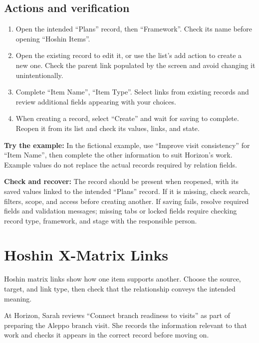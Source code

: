 \subsection{Actions and verification}
\begin{enumerate}
\item Open the intended “Plans” record, then “Framework”. Check its name before opening “Hoshin Items”.
\item Open the existing record to edit it, or use the list's add action to create a new one. Check the parent link populated by the screen and avoid changing it unintentionally.
\item Complete “Item Name”, “Item Type”. Select links from existing records and review additional fields appearing with your choices.
\item When creating a record, select “Create” and wait for saving to complete. Reopen it from its list and check its values, links, and state.
\end{enumerate}

\textbf{Try the example:} In the fictional example, use “Improve visit consistency” for “Item Name”, then complete the other information to suit Horizon's work. Example values do not replace the actual records required by relation fields.

\textbf{Check and recover:} The record should be present when reopened, with its saved values linked to the intended “Plans” record. If it is missing, check search, filters, scope, and access before creating another. If saving fails, resolve required fields and validation messages; missing tabs or locked fields require checking record type, framework, and stage with the responsible person.

\clearpage
\section{Hoshin X-Matrix Links}
\label{sec:projects-feature-planning-hoshin-x-matrix-links}

Hoshin matrix links show how one item supports another. Choose the source, target, and link type, then check that the relationship conveys the intended meaning.

\begin{rcnote}
At Horizon, Sarah reviews “Connect branch readiness to visits” as part of preparing the Aleppo branch visit. She records the information relevant to that work and checks it appears in the correct record before moving on.
\end{rcnote}

